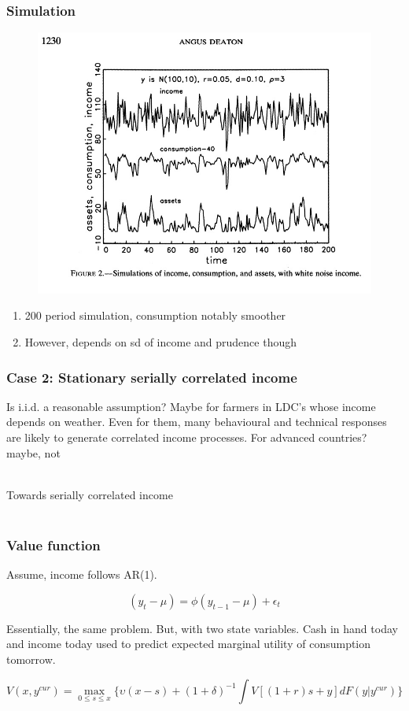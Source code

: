 \documentclass[mathserif]{beamer}
\begin{document}
\begin{frame}
\frametitle{Simulation}
\begin{figure}
\includegraphics[height=2.5 in, scale=0.5]{figure2.jpg}
\end{figure}
\begin{enumerate}
  \item 200 period simulation, consumption notably smoother
  \item However, depends on sd of income and prudence though
\end{enumerate}
\end{frame}

\begin{frame}
\frametitle{Case 2: Stationary serially correlated income}

Is i.i.d. a reasonable assumption?
Maybe for farmers in LDC's whose income depends on weather. Even for them, many behavioural and technical responses are likely to generate correlated income processes. For advanced countries? maybe, not \\\

Towards serially correlated income \\\

\end{frame}

\begin{frame}
\frametitle{Value function}

Assume, income follows AR(1).  

\begin{equation*}
    (y_{t} - \mu) = \phi(y_{t - 1} - \mu) + \epsilon_{t}
\end{equation*}

Essentially, the same problem. But, with two state variables. Cash in hand today and income today used to predict expected marginal utility of consumption tomorrow.

\begin{equation}
        V(x, y^{cur}) = \underset{0 \leq s \leq x}{\max}\Bigg\{\upsilon(x-s) + (1+\delta)^{-1}\int V[(1+r)s + y] dF(y | y^{cur})\Bigg\}
\end{equation}
\end{frame}
\end{document}
